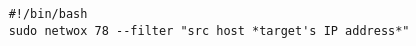 \begin{verbatim}
    #!/bin/bash
    sudo netwox 78 --filter "src host *target's IP address*"
\end{verbatim}